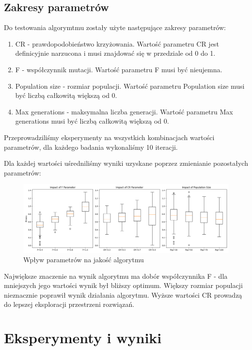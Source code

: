 \documentclass{article}
\begin{document}
\subsection{Zakresy parametrów}
Do testowania algorymtmu zostały użyte następujące zakresy parametrów:

\begin{enumerate}
    \item CR - prawdopodobieństwo krzyżowania. Wartość parametru CR jest definicyjnie narzucona i musi znajdować się w przedziale od 0 do 1.
    \item F - współczynnik mutacji. Wartość parametru F musi być nieujemna.
    \item Population size - rozmiar populacji. Wartość parametru Population size musi być liczbą całkowitą większą od 0.
    \item Max generations - maksymalna liczba generacji. Wartość parametru Max generations musi być liczbą całkowitą większą od 0.
\end{enumerate}
Przeprowadziliśmy eksperymenty na wszystkich kombinacjach wartości parametrów, dla każdego badania wykonaliśmy 10 iteracji.

Dla każdej wartości uśredniliśmy wyniki uzyskane poprzez zmienianie pozostałych parametrów:

\begin{figure}[H]
    \centering
    \includegraphics[width=\textwidth]{parameter_tuning_results.png}
    \caption{Wpływ parametrów na jakość algorytmu}
    \label{fig:parameter_results}
\end{figure}

Największe znaczenie na wynik algorytmu ma dobór współczynnika F - dla mniejszych jego wartości wynik był bliższy optimum. Większy rozmiar populacji nieznacznie poprawił wynik działania algorytmu. Wyższe wartości CR prowadzą do lepszej eksploracji przestrzeni rozwiązań.

\section{Eksperymenty i wyniki}
\end{document}
